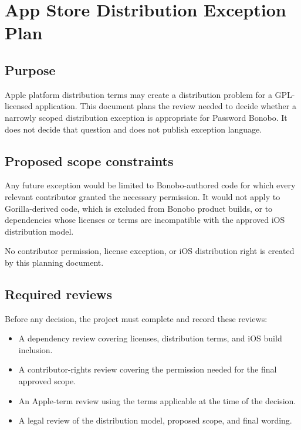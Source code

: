 \documentclass[
]{article}
\author{}
\date{}
\providecommand{\tightlist}{%
  \setlength{\itemsep}{0pt}\setlength{\parskip}{0pt}}
\begin{document}
{
\setcounter{tocdepth}{3}
\tableofcontents
}
\section{App Store Distribution Exception
Plan}\label{app-store-distribution-exception-plan}

\subsection{Purpose}\label{purpose}

Apple platform distribution terms may create a distribution problem for
a GPL-licensed application. This document plans the review needed to
decide whether a narrowly scoped distribution exception is appropriate
for Password Bonobo. It does not decide that question and does not
publish exception language.

\subsection{Proposed scope
constraints}\label{proposed-scope-constraints}

Any future exception would be limited to Bonobo-authored code for which
every relevant contributor granted the necessary permission. It would
not apply to Gorilla-derived code, which is excluded from Bonobo product
builds, or to dependencies whose licenses or terms are incompatible with
the approved iOS distribution model.

No contributor permission, license exception, or iOS distribution right
is created by this planning document.

\subsection{Required reviews}\label{required-reviews}

Before any decision, the project must complete and record these reviews:

\begin{itemize}
\tightlist
\item
  A dependency review covering licenses, distribution terms, and iOS
  build inclusion.
\item
  A contributor-rights review covering the permission needed for the
  final approved scope.
\item
  An Apple-term review using the terms applicable at the time of the
  decision.
\item
  A legal review of the distribution model, proposed scope, and final
  wording.
\end{itemize}
\end{document}
